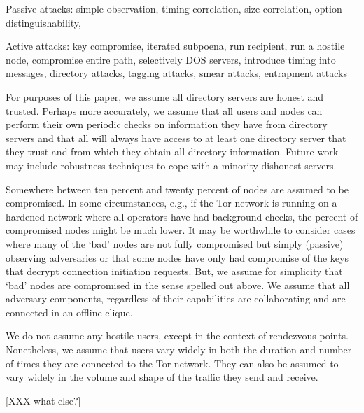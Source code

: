 \documentclass[times,10pt,twocolumn]{article}
\begin{document}
Passive attacks:
simple observation,
timing correlation,
size correlation,
option distinguishability,

Active attacks:
key compromise,
iterated subpoena,
run recipient,
run a hostile node,
compromise entire path,
selectively DOS servers,
introduce timing into messages,
directory attacks,
tagging attacks,
smear attacks,
entrapment attacks



For purposes of this paper, we assume all directory servers are honest
and trusted. Perhaps more accurately, we assume that all users and
nodes can perform their own periodic checks on information they have
from directory servers and that all will always have access to at
least one directory server that they trust and from which they obtain
all directory information. Future work may include robustness
techniques to cope with a minority dishonest servers.

Somewhere between ten percent and twenty percent of nodes are assumed
to be compromised. In some circumstances, e.g., if the Tor network is
running on a hardened network where all operators have had
background checks, the percent of compromised nodes might be much
lower. It may be worthwhile to consider cases where many of the `bad'
nodes are not fully compromised but simply (passive) observing
adversaries or that some nodes have only had compromise of the keys
that decrypt connection initiation requests. But, we assume for
simplicity that `bad' nodes are compromised in the sense spelled out
above. We assume that all adversary components, regardless of their
capabilities are collaborating and are connected in an offline clique.

We do not assume any hostile users, except in the context of
rendezvous points. Nonetheless, we assume that users vary widely in
both the duration and number of times they are connected to the Tor
network. They can also be assumed to vary widely in the volume and
shape of the traffic they send and receive.


[XXX what else?]



\label{sec:design}
\end{document}
